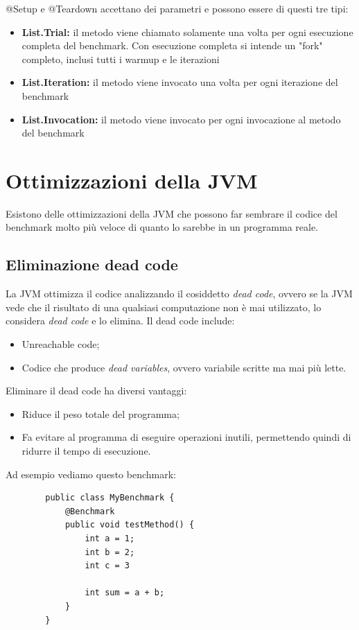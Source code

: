 \documentclass[a4paper, 11pt,            %
openright,               %
italian,
english                 
]{article}       %
\begin{document}
	@Setup e @Teardown accettano dei parametri e possono essere di questi tre tipi: 
	\begin{itemize}
		\item \textbf{List.Trial:} il metodo viene chiamato solamente una volta per ogni esecuzione completa del benchmark. Con esecuzione completa si intende un "fork" completo, inclusi tutti i warmup e le iterazioni
		\item \textbf{List.Iteration:} il metodo viene invocato una volta per ogni iterazione del benchmark
		\item \textbf{List.Invocation:} il metodo viene invocato per ogni invocazione al metodo del benchmark
	\end{itemize}
	
	
	
	\section{Ottimizzazioni della JVM}
	
	Esistono delle ottimizzazioni della JVM che possono far sembrare il codice del benchmark molto più veloce di quanto lo sarebbe in un programma reale.
	
	\subsection{Eliminazione dead code}
	
	La JVM ottimizza il codice analizzando il cosiddetto \textit{dead code}, ovvero se la JVM vede che il risultato di una qualsiasi computazione non è mai utilizzato, lo considera \textit{dead code} e lo elimina.
	Il dead code include:
	\begin{itemize}
		\item Unreachable code;
		\item Codice che produce \textit{dead variables}, ovvero variabile scritte ma mai più lette.
	\end{itemize}

	Eliminare il dead code ha diversi vantaggi:
	\begin{itemize}
		\item Riduce il peso totale del programma;
		\item Fa evitare al programma di eseguire operazioni inutili, permettendo quindi di ridurre il tempo di esecuzione.
	\end{itemize}
	Ad esempio vediamo questo benchmark:
	
	\begin{lstlisting}
		public class MyBenchmark {
			@Benchmark
			public void testMethod() {
				int a = 1;
				int b = 2;
				int c = 3
				
				int sum = a + b;
			}
		}
	\end{lstlisting}
	
\end{document}
